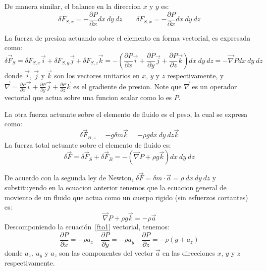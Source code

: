 \documentclass[10pt, oneside]{article}
\begin{document}
De manera similar, el balance en la direccion $x$ y $y$ es:
$$
\delta F_{S,x} =  -\frac{\partial P}{\partial x} dx\ dy\ dz \quad \quad  \delta F_{S,x} =  -\frac{\partial P}{\partial x} dx\ dy\ dz
$$

La fuerza de presion actuando sobre el elemento en forma vectorial, es expresada como:
$$
\delta \vec{F}_S = \delta F_{S,x}\vec{i} + \delta F_{S,y} \vec{j} + \delta F_{S,z}\vec{k} = -\left( \frac{\partial P}{\partial x}\vec{i} + \frac{\partial P}{\partial y}\vec{j} + \frac{\partial P}{\partial z}\vec{k} \right) dx\ dy\ dz = -\vec{\nabla}P dx\ dy\ dz
$$
donde $\vec{i}$, $\vec{j}$ y $\vec{k}$ son los vectores unitarios en $x$, $y$ y $z$ respectivamente, y $\vec{\nabla}= \frac{\partial P}{\partial x}\vec{i} + \frac{\partial P}{\partial y}\vec{j} + \frac{\partial P}{\partial z}\vec{k}$ es el gradiente de presion. Note que $\vec{\nabla}$ es un operador vectorial que actua sobre una funcion scalar como lo es $P$.

La otra fuerza actuante sobre el elemento de fluido es el peso, la cual se expresa como:
$$
\delta \vec{F}_{B,z} = -g \delta m \vec{k} = -\rho g dx\ dy\ dz \vec{k}
$$
La fuerza total actuante sobre el elemento de fluido es:
\begin{equation}
\delta \vec{F} = \delta \vec{F}_S + \delta \vec{F}_B = -\left( \vec{\nabla}P + \rho g \vec{k}\right) dx\ dy\ dz
\label{fto}
\end{equation}

De acuerdo con la segunda ley de Newton, $\delta \vec{F} = \delta m \cdot \vec{a} = \rho\ dx\ dy\ dz$ y substituyendo en la ecuacion anterior tenemos que la ecuacion general de moviento de un fluido que actua como un cuerpo rigido (sin esfuerzos cortantes) es:
\begin{equation}
\vec{\nabla}P + \rho g \vec{k} = -\rho \vec{a}
\label{fto1}
\end{equation}
Descomponiendo la ecuaci\'on~\ref{fto1}  vectorial, tenemos:
\begin{equation}
\frac{\partial P}{\partial x} = -\rho a_x \quad \frac{\partial P}{\partial y} = -\rho a_y \quad \frac{\partial P}{\partial z} = -\rho (g+ a_z )
\label{fto2}
\end{equation}
donde $a_x$, $a_y$ y $a_z$ son las componentes del vector $\vec{a}$ en las direcciones $x$, $y$ y $z$ respectivamente.
\end{document}
